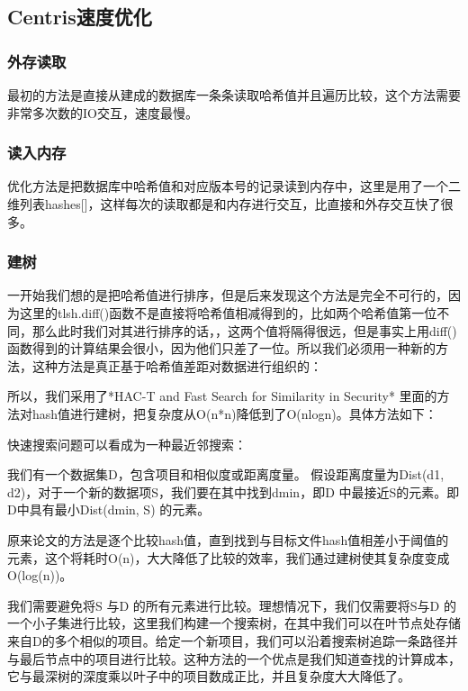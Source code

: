 \documentclass{cjc}
\begin{document}
\subsection{Centris速度优化}
\subsubsection{外存读取}

最初的方法是直接从建成的数据库一条条读取哈希值并且遍历比较，这个方法需要非常多次数的IO交互，速度最慢。
\subsubsection{读入内存}
优化方法是把数据库中哈希值和对应版本号的记录读到内存中，这里是用了一个二维列表hashes[]，这样每次的读取都是和内存进行交互，比直接和外存交互快了很多。

\subsubsection{建树}

一开始我们想的是把哈希值进行排序，但是后来发现这个方法是完全不可行的，因为这里的tlsh.diff()函数不是直接将哈希值相减得到的，比如两个哈希值第一位不同，那么此时我们对其进行排序的话，，这两个值将隔得很远，但是事实上用diff()函数得到的计算结果会很小，因为他们只差了一位。所以我们必须用一种新的方法，这种方法是真正基于哈希值差距对数据进行组织的：

所以，我们采用了*HAC-T and Fast Search for Similarity in Security* 里面的方法对hash值进行建树，把复杂度从O(n*n)降低到了O(nlogn)。具体方法如下：

快速搜索问题可以看成为一种最近邻搜索： 

我们有一个数据集D，包含项目和相似度或距离度量。 假设距离度量为Dist(d1, d2)，对于一个新的数据项S，我们要在其中找到dmin，即D 中最接近S的元素。即D中具有最小Dist(dmin, S) 的元素。

原来论文的方法是逐个比较hash值，直到找到与目标文件hash值相差小于阈值的元素，这个将耗时O(n)，大大降低了比较的效率，我们通过建树使其复杂度变成O(log(n))。

我们需要避免将S 与D 的所有元素进行比较。理想情况下，我们仅需要将S与D 的一个小子集进行比较，这里我们构建一个搜索树，在其中我们可以在叶节点处存储来自D的多个相似的项目。给定一个新项目，我们可以沿着搜索树追踪一条路径并与最后节点中的项目进行比较。这种方法的一个优点是我们知道查找的计算成本，它与最深树的深度乘以叶子中的项目数成正比，并且复杂度大大降低了。

\end{document}
